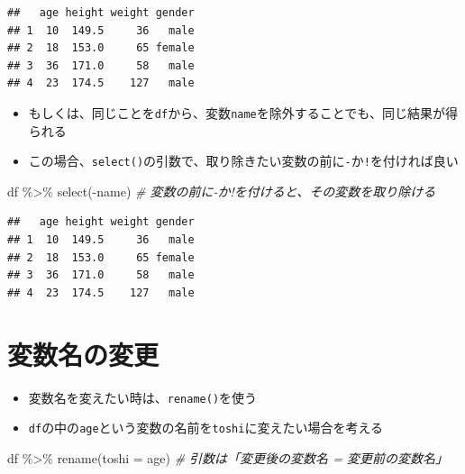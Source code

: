 \documentclass[
]{book}
\newenvironment{Shaded}{\begin{snugshade}}{\end{snugshade}}
\newcommand{\AttributeTok}[1]{\textcolor[rgb]{0.77,0.63,0.00}{#1}}
\newcommand{\CommentTok}[1]{\textcolor[rgb]{0.56,0.35,0.01}{\textit{#1}}}
\newcommand{\FunctionTok}[1]{\textcolor[rgb]{0.00,0.00,0.00}{#1}}
\newcommand{\NormalTok}[1]{#1}
\newcommand{\SpecialCharTok}[1]{\textcolor[rgb]{0.00,0.00,0.00}{#1}}
\providecommand{\tightlist}{%
  \setlength{\itemsep}{0pt}\setlength{\parskip}{0pt}}
\begin{document}
\begin{verbatim}
##   age height weight gender
## 1  10  149.5     36   male
## 2  18  153.0     65 female
## 3  36  171.0     58   male
## 4  23  174.5    127   male
\end{verbatim}

\begin{itemize}
\tightlist
\item
  もしくは、同じことを\texttt{df}から、変数\texttt{name}を除外することでも、同じ結果が得られる
\item
  この場合、\texttt{select()}の引数で、取り除きたい変数の前に\texttt{-}か\texttt{!}を付ければ良い
\end{itemize}

\begin{Shaded}
\begin{Highlighting}[]
\NormalTok{df }\SpecialCharTok{\%\textgreater{}\%} 
  \FunctionTok{select}\NormalTok{(}\SpecialCharTok{{-}}\NormalTok{name) }\CommentTok{\# 変数の前に{-}か!を付けると、その変数を取り除ける}
\end{Highlighting}
\end{Shaded}

\begin{verbatim}
##   age height weight gender
## 1  10  149.5     36   male
## 2  18  153.0     65 female
## 3  36  171.0     58   male
## 4  23  174.5    127   male
\end{verbatim}

\hypertarget{ux5909ux6570ux540dux306eux5909ux66f4}{%
\section{変数名の変更}\label{ux5909ux6570ux540dux306eux5909ux66f4}}

\begin{itemize}
\tightlist
\item
  変数名を変えたい時は、\texttt{rename()}を使う
\item
  \texttt{df}の中の\texttt{age}という変数の名前を\texttt{toshi}に変えたい場合を考える
\end{itemize}

\begin{Shaded}
\begin{Highlighting}[]
\NormalTok{df }\SpecialCharTok{\%\textgreater{}\%} 
  \FunctionTok{rename}\NormalTok{(}\AttributeTok{toshi =}\NormalTok{ age) }\CommentTok{\# 引数は「変更後の変数名 = 変更前の変数名」}
\end{Highlighting}
\end{Shaded}
\end{document}
